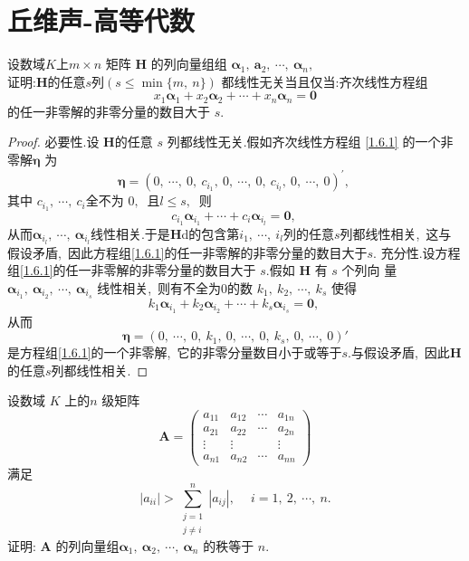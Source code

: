 \section{丘维声-高等代数}
\begin{problem}
	设数域$  K  $上$  m \times n $ 矩阵  $\boldsymbol{H} $ 的列向量组组 $\boldsymbol{\alpha}_{1},\  \boldsymbol{a}_{2} ,\ \cdots,\ \boldsymbol{\alpha}_n,\ $\\
	证明:$\boldsymbol{H}$的任意$s$列$  (s \leqslant \min \{m,\  n\})$  都线性无关当且仅当:齐次线性方程组
	\begin{equation}
		x_{1} \boldsymbol{\alpha}_{1}+x_{2} \boldsymbol{\alpha}_{2}+\cdots+x_{n} \boldsymbol{\alpha}_{n}=\mathbf{0}\label{1.6.1}
	\end{equation}
	的任一非零解的非零分量的数目大于 $ s.$ 
\end{problem}
\begin{proof}
	必要性.设 $ \boldsymbol{H}  $的任意  $s$  列都线性无关.假如齐次线性方程组 \eqref{1.6.1} 的一个非零解$  \boldsymbol{\eta}$  为
	$$\boldsymbol{\eta}=\left(0,\  \cdots,\  0,\  c_{i_{1}},\  0,\  \cdots,\  0,\  c_{i_{l}},\  0,\  \cdots,\  0\right)^{\prime},\ $$
	其中 $ c_{i_{1}},\  \cdots,\  c_{i} $全不为 $0 ,\ $ 且$  l \leqslant s ,\ $ 则
	$$c_{i_{1}} \boldsymbol{\alpha}_{i_{1}}+\cdots+c_{i} \boldsymbol{\alpha}_{i_{l}}=\mathbf{0},\ $$
	从而$\boldsymbol{\alpha}_{i_{l}},\ \cdots,\ \boldsymbol{\alpha}_{i_{l}}$线性相关.于是$\boldsymbol{H}$d的包含第$i_1,\ \cdots,\ i_l$列的任意$s$列都线性相关,\ 这与假设矛盾,\ 因此方程组\ref{1.6.1}的任一非零解的非零分量的数目大于$  s .$
	充分性.设方程组\ref{1.6.1}的任一非零解的非零分量的数目大于  $s.$假如  $\boldsymbol{H} $ 有  $s $ 个列向 量  $\boldsymbol{\alpha}_{i_{1}},\  \boldsymbol{\alpha}_{i_{2}},\  \cdots,\  \boldsymbol{\alpha}_{i_{s}} $ 线性相关,\  则有不全为$ 0 $的数 $ k_{1},\  k_{2},\  \cdots,\  k_{s} $ 使得
	$$k_1\boldsymbol{\alpha}_{i_{1}}+k_2\boldsymbol{\alpha}_{i_{2}}+\cdots+k_s\boldsymbol{\alpha}_{i_{s}}=\mathbf{0,\ }$$
	从而
	$$\boldsymbol{\eta}=(0,\ \cdots,\ 0,\ k_1,\ 0,\ \cdots,\ 0,\ k_s,\ 0,\ \cdots,\ 0)'$$
	是方程组\ref{1.6.1}的一个非零解,\ 它的非零分量数目小于或等于$s.$与假设矛盾,\ 因此$\boldsymbol{H}$的任意$s$列都线性相关.
\end{proof}
\newpage
\begin{problem}
	设数域  $K$  上的$  n$  级矩阵
	$$\boldsymbol{A}=\left(\begin{array}{cccc}
		a_{11} & a_{12} & \cdots & a_{1 n} \\
		a_{21} & a_{22} & \cdots & a_{2 n} \\
		\vdots & \vdots & & \vdots \\
		a_{n 1} & a_{n 2} & \cdots & a_{n n}
	\end{array}\right)$$
	满足
	$$\left|a_{i i}\right|>\sum_{\substack{j=1 \\ j \neq i}}^{n}\left|a_{i j}\right|,\  \quad i=1,\ 2,\  \cdots,\  n .$$
	证明: $ \boldsymbol{A}$  的列向量组$  \boldsymbol{\alpha}_{1},\  \boldsymbol{\alpha}_{2},\  \cdots,\  \boldsymbol{\alpha}_{n} $ 的秩等于 $ n.$
\end{problem}
